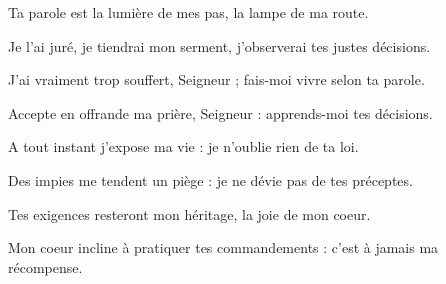 \item Ta parole est la lumière de mes pas, la lampe de ma route.

\item Je l'ai juré, je tiendrai mon serment, j'observerai tes justes décisions.

\item J'ai vraiment trop souffert, Seigneur ; fais-moi vivre selon ta parole.

\item Accepte en offrande ma prière, Seigneur : apprends-moi tes décisions.

\item A tout instant j'expose ma vie : je n'oublie rien de ta loi.

\item Des impies me tendent un piège : je ne dévie pas de tes préceptes.

\item Tes exigences resteront mon héritage, la joie de mon coeur.

\item Mon coeur incline à pratiquer tes commandements : c'est à jamais ma récompense.